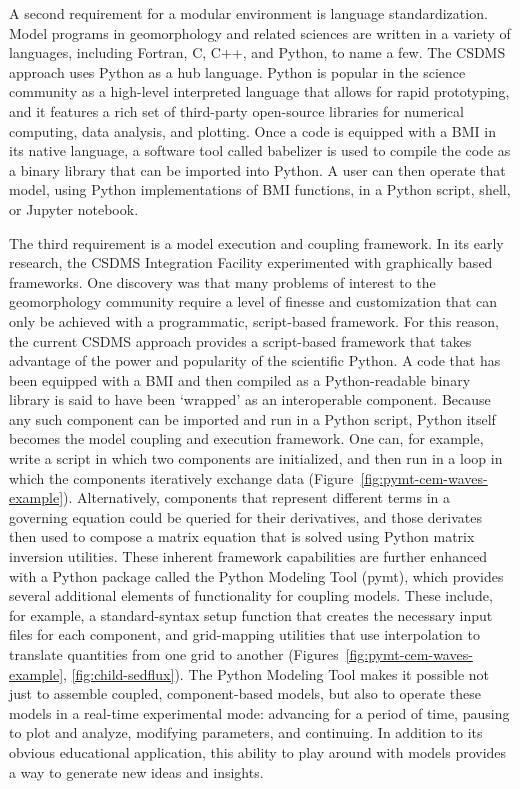 \documentclass[10pt,twocolumn,preprint]{elsarticle}
\begin{document}
A second requirement for a modular environment is language standardization. Model programs in geomorphology and related sciences are written in a variety of languages, including Fortran, C, C++, and Python, to name a few. The CSDMS approach uses Python as a hub language. Python is  popular in the science community as a high-level interpreted language that allows for rapid prototyping, and it features a rich set of third-party open-source libraries for numerical computing, data analysis, and plotting. Once a code is equipped with a BMI in its native language, a software tool called babelizer is used to compile the code as a binary library that can be imported into Python. A user can then operate that model, using Python implementations of BMI functions, in a Python script, shell, or Jupyter notebook.

The third requirement is a model execution and coupling framework. In its early research, the CSDMS Integration Facility experimented with graphically based frameworks. One discovery was that many problems of interest to the geomorphology community require a level of finesse and customization that can only be achieved with a programmatic, script-based framework.  For this reason, the current CSDMS approach provides a script-based framework that takes advantage of the power and popularity of the scientific Python. A code that has been equipped with a BMI and then compiled as a Python-readable binary library is said to have been `wrapped' as an interoperable component. Because any such component can be imported and run in a Python script, Python itself becomes the model coupling and execution framework. One can, for example, write a script in which two components are initialized, and then run in a loop in which the components iteratively exchange data (Figure~\ref{fig:pymt-cem-waves-example}). Alternatively, components that represent different terms in a governing equation could be queried for their derivatives, and those derivates then used to compose a matrix equation that is solved using Python matrix inversion utilities. These inherent framework capabilities are further enhanced with a Python package called the Python Modeling Tool (pymt), which provides several additional elements of functionality for coupling models. These include, for example, a standard-syntax setup function that creates the necessary input files for each component, and grid-mapping utilities that use interpolation to translate quantities from one grid to another (Figures~\ref{fig:pymt-cem-waves-example}, \ref{fig:child-sedflux}). The Python Modeling Tool makes it possible not just to assemble coupled, component-based models, but also to operate these models in a real-time experimental mode: advancing for a period of time, pausing to plot and analyze, modifying parameters, and continuing. In addition to its obvious educational application, this ability to play around with models provides a way to generate new ideas and insights.
\end{document}
